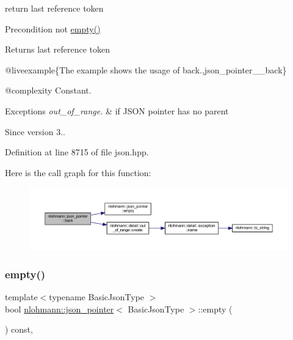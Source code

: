 return last reference token 

\begin{DoxyPrecond}{Precondition}
not {\ttfamily \mbox{\hyperlink{classnlohmann_1_1json__pointer_a649252bda4a2e75a0915b11a25d8bcc3}{empty()}}} 
\end{DoxyPrecond}
\begin{DoxyReturn}{Returns}
last reference token
\end{DoxyReturn}
@liveexample\{The example shows the usage of {\ttfamily back}.,json\+\_\+pointer\+\_\+\+\_\+back\}

@complexity Constant.


\begin{DoxyExceptions}{Exceptions}
{\em out\+\_\+of\+\_\+range.} & if J\+S\+ON pointer has no parent\\
\hline
\end{DoxyExceptions}
\begin{DoxySince}{Since}
version 3.. 
\end{DoxySince}


Definition at line 8715 of file json.\+hpp.

Here is the call graph for this function\+:
\nopagebreak
\begin{figure}[H]
\begin{center}
\leavevmode
\includegraphics[width=350pt]{classnlohmann_1_1json__pointer_a6bd5b554c10f15672135c216893eef31_cgraph}
\end{center}
\end{figure}
\mbox{\label{classnlohmann_1_1json__pointer_a649252bda4a2e75a0915b11a25d8bcc3}} 
\subsubsection{\texorpdfstring{empty()}{empty()}}
{\footnotesize\ttfamily template$<$typename Basic\+Json\+Type $>$ \\
bool \mbox{\hyperlink{classnlohmann_1_1json__pointer}{nlohmann\+::json\+\_\+pointer}}$<$ Basic\+Json\+Type $>$\+::empty (\begin{DoxyParamCaption}{ }\end{DoxyParamCaption}) const\hspace{0.3cm}{\ttfamily [inline]}, {\ttfamily [noexcept]}}




